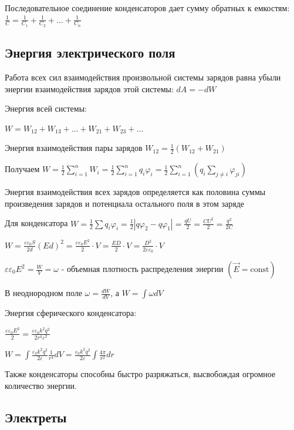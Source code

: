 \documentclass[12pt]{article}
\begin{document}
Последовательное соединение конденсаторов дает сумму обратных к емкостям: $\frac{1}{C} = \frac{1}{C_1} + \frac{1}{C_2} + \dots + \frac{1}{C_n}$

\subsection{Энергия электрического поля}

Работа всех сил взаимодействия произвольной системы зарядов равна убыли энергии взаимодействия зарядов этой системы: $dA = -dW$

Энергия всей системы:

$W = W_{12} + W_{13} + \dots + W_{21} + W_{23} + \dots$

Энергия взаимодействия пары зарядов $W_{12} = \frac{1}{2} (W_{12} + W_{21})$

Получаем $W = \frac{1}{2} \sum_{i = 1}^n W_i = \frac{1}{2} \sum_{i = 1}^n q_i \varphi_i = \frac{1}{2}\sum_{i = 1}^n \left(q_i \sum_{j \neq i} \varphi_{ji}\right)$

Энергия взаимодействия всех зарядов определяется как половина суммы произведения зарядов и потенциала остального поля в этом заряде

Для конденсатора $W = \frac{1}{2} \sum q_i \varphi_i = \frac{1}{2} |q \varphi_2 - q \varphi_1| = \frac{qU}{2} = \frac{CU^2}{2} = \frac{q^2}{2C}$

$W = \frac{\varepsilon \varepsilon_0 S}{2d} (Ed)^2 = \frac{\varepsilon \varepsilon_0 E^2}{2} \cdot V = \frac{E D}{2} \cdot V = \frac{D^2}{2\varepsilon \varepsilon_0} \cdot V$

$\varepsilon \varepsilon_0 E^2 = \frac{W}{V} = \omega$ - объемная плотность распределения энергии $(\vec{E} = \mathrm{const})$

В неоднородном поле $\omega = \frac{dW}{dV}$, а $W = \int \omega dV$

Энергия сферического конденсатора:

$\frac{\varepsilon \varepsilon_0 E^2}{2} = \frac{\varepsilon \varepsilon_0 k^2 q^2}{2r^4 \varepsilon^2}$

$W = \int \frac{\varepsilon_0 k^2 q^2}{2\varepsilon} \frac{1}{r^4} dV = \frac{\varepsilon_0 k^2 q^2}{2\varepsilon} \int \frac{4\pi}{r^2} dr$

Также конденсаторы способны быстро разряжаться, высвобождая огромное количество энергии.

\subsection{Электреты}
\end{document}

